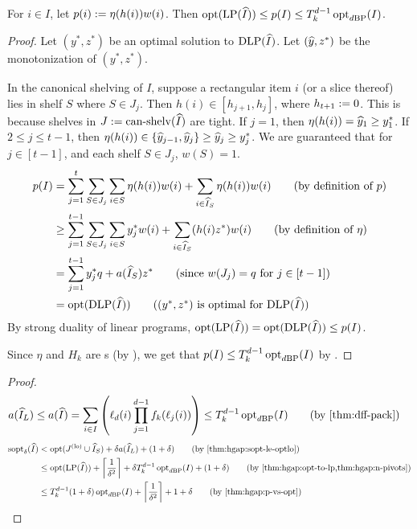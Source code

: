 \begin{lemma}
\label{thm:hgap:p-vs-opt}
For $i \in I$, let $p(i) := \eta(h(i))w(i)$.
Then $\operatorname{opt}(\operatorname{LP}(\widehat{I})) \le p(I) \le T_k^{d-1}\operatorname{opt}_{d\mathrm{BP}}(I)$.
\end{lemma}
\begin{proof}
Let $(y^*, z^*)$ be an optimal solution to $\operatorname{DLP}(\widehat{I})$.
Let $(\widehat{y}, z^*)$ be the monotonization of $(y^*, z^*)$.

In the canonical shelving of $I$, suppose a rectangular item $i$ (or a slice thereof)
lies in shelf $S$ where $S \in J_j$.
Then $h(i) \in [h_{j+1}, h_j]$, where $h_{t+1} := 0$.
This is because shelves in $J := \operatorname{can-shelv}(\widehat{I})$ are tight.
If $j = 1$, then $\eta(h(i)) = \widehat{y}_1 \ge y^*_1$.
If $2 \le j \le t-1$, then $\eta(h(i)) \in \{\widehat{y}_{j-1}, \widehat{y}_j\} \ge \widehat{y}_j \ge y^*_j$.
We are guaranteed that for $j \in [t-1]$, and each shelf $S \in J_j$, $w(S) = 1$.
\begin{align*}
p(I) &= \sum_{j=1}^t \sum_{S \in J_j} \sum_{i \in S} \eta(h(i))w(i)
    + \sum_{i \in \Ihat_S} \eta(h(i))w(i)
    \tag{by definition of $p$}
\\ &\ge \sum_{j=1}^{t-1} \sum_{S \in J_j} \sum_{i \in S} y^*_j w(i)
    + \sum_{i \in \Ihat_S} (h(i)z^*)w(i)
\tag{by definition of $\eta$}
\\ &= \sum_{j=1}^{t-1} y^*_j q + a(\Ihat_S)z^*
\tag{since $w(J_j) = q$ for $j \in [t-1]$}
\\ &= \opt(\DLP(\Ihat))
\tag{$(y^*, z^*)$ is optimal for $\DLP(\Ihat)$}
\end{align*}
By strong duality of linear programs, $\operatorname{opt}(\operatorname{LP}(\widehat{I})) = \operatorname{opt}(\operatorname{DLP}(\widehat{I})) \le p(I)$.

Since $\eta$ and $H_k$ are \dff{}s (by ),
we get that $p(I) \le T_k^{d-1}\operatorname{opt}_{d\mathrm{BP}}(I)$ by .
\end{proof}

\rthmHgapStruct*
\begin{proof}
\begin{align*}
& a(\Ihat_L) \le a(\Ihat)
= \sum_{i \in I} \left(\ell_d(i)\prod_{j=1}^{d-1} f_k(\ell_j(i))\right)
\le T_k^{d-1}\optdbp(I)
\tag{by \thmdepcref{thm:dff-pack}{thm:hgap:struct}}
\end{align*}
\begin{align*}
\sopt_{\delta}(\Ihat) &< \opt(J\lo \cup \Ihat_S) + \delta a(\Ihat_L) + (1+\delta)
\tag{by \thmdepcref{thm:hgap:sopt-le-optlo}{thm:hgap:struct}}
\\ &\le \opt(\LP(\Ihat)) + \ceil{\frac{1}{\delta^2}} + \delta T_k^{d-1}\optdbp(I) + (1+\delta)
\tag{by \thmdepcref{thm:hgap:opt-to-lp,thm:hgap:n-pivots}{thm:hgap:struct}}
\\ &\le T_k^{d-1}(1+\delta)\optdbp(I) + \ceil{\frac{1}{\delta^2}} + 1 + \delta
\tag{by \thmdepcref{thm:hgap:p-vs-opt}{thm:hgap:struct}}
\end{align*}
\end{proof}

